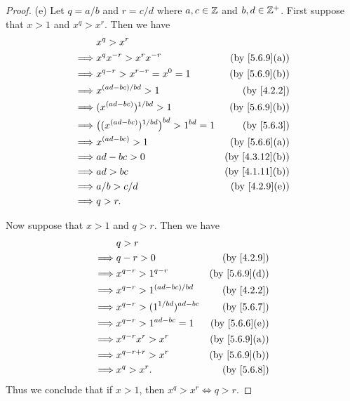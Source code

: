 \begin{proof}{(e)}
  Let \(q = a / b\) and \(r = c / d\) where \(a, c \in \mathbb{Z}\) and \(b, d \in \mathbb{Z}^+\).
  First suppose that \(x > 1\) and \(x^q > x^r\).
  Then we have
  \begin{align*}
             & x^q > x^r                                                                           \\
    \implies & x^q x^{-r} > x^r x^{-r}                              & \text{(by \cref{5.6.9}(a))}  \\
    \implies & x^{q - r} > x^{r - r} = x^0 = 1                      & \text{(by \cref{5.6.9}(b))}  \\
    \implies & x^{(ad - bc) / bd} > 1                               & \text{(by \cref{4.2.2})}     \\
    \implies & (x^{(ad - bc)})^{1 / bd} > 1                         & \text{(by \cref{5.6.9}(b))}  \\
    \implies & \big((x^{(ad - bc)})^{1 / bd}\big)^{bd} > 1^{bd} = 1 & \text{(by \cref{5.6.3})}     \\
    \implies & x^{(ad - bc)} > 1                                    & \text{(by \cref{5.6.6}(a))}  \\
    \implies & ad - bc > 0                                          & \text{(by \cref{4.3.12}(b))} \\
    \implies & ad > bc                                              & \text{(by \cref{4.1.11}(b))} \\
    \implies & a / b > c / d                                        & \text{(by \cref{4.2.9}(e))}  \\
    \implies & q > r.
  \end{align*}

  Now suppose that \(x > 1\) and \(q > r\).
  Then we have
  \begin{align*}
             & q > r                                                            \\
    \implies & q - r > 0                          & \text{(by \cref{4.2.9})}    \\
    \implies & x^{q - r} > 1^{q - r}              & \text{(by \cref{5.6.9}(d))} \\
    \implies & x^{q - r} > 1^{(ad - bc) / bd}     & \text{(by \cref{4.2.2})}    \\
    \implies & x^{q - r} > (1^{1 / bd})^{ad - bc} & \text{(by \cref{5.6.7})}    \\
    \implies & x^{q - r} > 1^{ad - bc} = 1        & \text{(by \cref{5.6.6}(e))} \\
    \implies & x^{q - r} x^r > x^r                & \text{(by \cref{5.6.9}(a))} \\
    \implies & x^{q - r + r} > x^r                & \text{(by \cref{5.6.9}(b))} \\
    \implies & x^q > x^r.                         & \text{(by \cref{5.6.8})}
  \end{align*}
  Thus we conclude that if \(x > 1\), then \(x^q > x^r \iff q > r\).


\end{proof}

